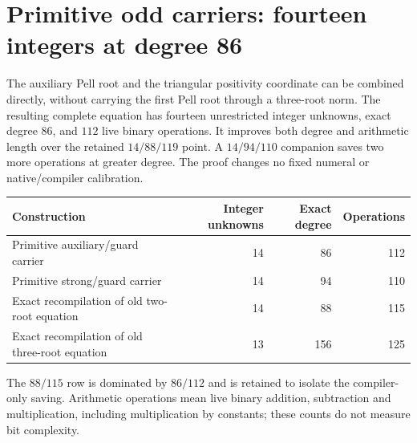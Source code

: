 \section{Primitive odd carriers: fourteen integers at degree 86}
\label{sec:root-primitives}

The auxiliary Pell root and the triangular positivity coordinate can be
combined directly, without carrying the first Pell root through a three-root
norm. The resulting complete equation has fourteen unrestricted integer
unknowns, exact degree $86$, and $112$ live binary operations. It improves
both degree and arithmetic length over the retained $14/88/119$ point.
A $14/94/110$ companion saves two more operations at greater degree.
The proof changes no fixed numeral or native/compiler calibration.

\begin{center}
\begin{tabular}{lrrr}
Construction & Integer unknowns & Exact degree & Operations\\\hline
Primitive auxiliary/guard carrier &14&86&112\\
Primitive strong/guard carrier &14&94&110\\
Exact recompilation of old two-root equation &14&88&115\\
Exact recompilation of old three-root equation &13&156&125
\end{tabular}
\end{center}
The $88/115$ row is dominated by $86/112$ and is retained to isolate the
compiler-only saving. Arithmetic operations mean live binary addition,
subtraction and multiplication, including multiplication by constants;
these counts do not measure bit complexity.

